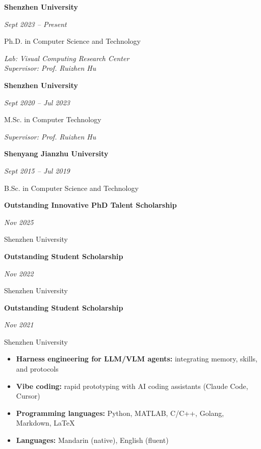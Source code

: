 \documentclass[10pt,a4paper,UTF8]{altacv}
\newcommand{\edu}[4]{%
  \begin{minipage}[t]{0.72\linewidth}\raggedright\textbf{#1}\end{minipage}\hfill\begin{minipage}[t]{0.27\linewidth}\raggedleft\textit{#2}\end{minipage}\par
  \vspace{5pt}
  {#3}\par
  \ifstrequal{#4}{}{}{\textit{#4}\par}
  \vspace{10pt}
}
\newcommand{\award}[3]{%
  \begin{minipage}[t]{0.72\linewidth}\raggedright\textbf{#1}\end{minipage}\hfill\begin{minipage}[t]{0.27\linewidth}\raggedleft\textit{#3}\end{minipage}\par
  \vspace{5pt}
  {#2}\par\vspace{10pt}
}
\begin{document}

\edu
  {Shenzhen University}
  {Sept 2023 -- Present}
  {Ph.D. in Computer Science and Technology}
  {Lab: Visual Computing Research Center\\Supervisor: Prof. Ruizhen Hu}

\edu
  {Shenzhen University}
  {Sept 2020 -- Jul 2023}
  {M.Sc. in Computer Technology}
  {Supervisor: Prof. Ruizhen Hu}

\edu
  {Shenyang Jianzhu University}
  {Sept 2015 -- Jul 2019}
  {B.Sc. in Computer Science and Technology}
  {}



\award
  {Outstanding Innovative PhD Talent Scholarship}
  {Shenzhen University}
  {Nov 2025}

\award
  {Outstanding Student Scholarship}
  {Shenzhen University}
  {Nov 2022}

\award
  {Outstanding Student Scholarship}
  {Shenzhen University}
  {Nov 2021}



\begin{itemize}
\item \textbf{Harness engineering for LLM/VLM agents:} integrating memory, skills, and protocols
\item \textbf{Vibe coding:} rapid prototyping with AI coding assistants (Claude Code, Cursor)
\item \textbf{Programming languages:} Python, MATLAB, C/C++, Golang, Markdown, LaTeX
\item \textbf{Languages:} Mandarin (native), English (fluent)
\end{itemize}
\end{document}
